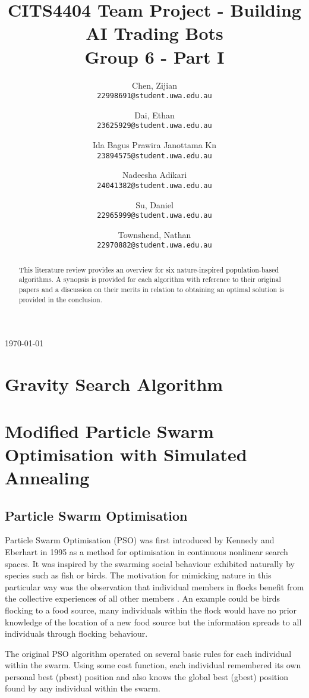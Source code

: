 \documentclass[a4paper, 12pt]{extarticle}
\title{
    CITS4404 Team Project - Building AI Trading Bots
    \\ \large Group 6 - Part I 
}
\author{
    Chen, Zijian\\
    \normalsize \texttt{22998691@student.uwa.edu.au}
    \and
    Dai, Ethan\\
    \normalsize \texttt{23625929@student.uwa.edu.au}
    \and
    Ida Bagus Prawira Janottama Kn\\
    \normalsize \texttt{23894575@student.uwa.edu.au}
    \and
    Nadeesha Adikari\\
    \normalsize \texttt{24041382@student.uwa.edu.au}
    \and
    Su, Daniel\\
    \normalsize \texttt{22965999@student.uwa.edu.au}
    \and
    Townshend, Nathan\\
    \normalsize \texttt{22970882@student.uwa.edu.au}
}
\date{}
\begin{document}
\maketitle

\begin{abstract}
    \noindent
    This literature review provides an overview for six nature-inspired population-based algorithms. A synopsis is provided for each algorithm with reference to their original papers and a discussion on their merits in relation to obtaining an optimal solution is provided in the conclusion.
\end{abstract}

\vfill

\begin{center}
    \today
\end{center}


\newpage
\tableofcontents



\newpage
\section{Gravity Search Algorithm}\label{sec:alg:gsa}


\newpage
\section{Modified Particle Swarm Optimisation with Simulated Annealing}

\subsection{Particle Swarm Optimisation}

Particle Swarm Optimisation (PSO) was first introduced by Kennedy and Eberhart \cite{kennedy1995particle} in 1995 as a method for optimisation in continuous nonlinear search spaces. It was inspired by the swarming social behaviour exhibited naturally by species such as fish or birds. The motivation for mimicking nature in this particular way was the observation that individual members in flocks benefit from the collective experiences of all other members \cite{wilson2000sociobiology}. An example could be birds flocking to a food source, many individuals within the flock would have no prior knowledge of the location of a new food source but the information spreads to all individuals through flocking behaviour. 

The original PSO algorithm operated on several basic rules for each individual within the swarm. Using some cost function, each individual remembered its own personal best (pbest) position and also knows the global best (gbest) position found by any individual within the swarm.
\end{document}
